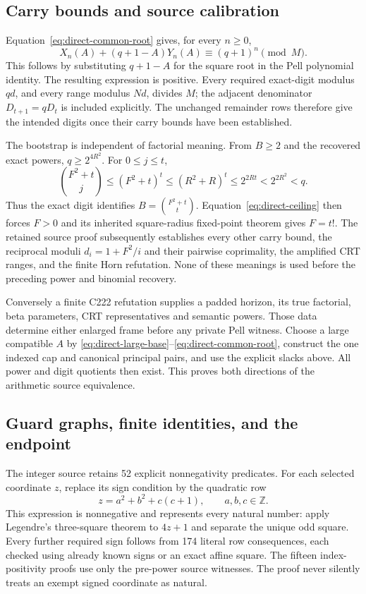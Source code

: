 \subsection{Carry bounds and source calibration}

Equation~\eqref{eq:direct-common-root} gives, for every $n\ge0$,
\[
 X_n(A)+(q+1-A)Y_n(A)\equiv(q+1)^n\pmod M.
\]
This follows by substituting $q+1-A$ for the square root in the Pell
polynomial identity. The resulting expression is positive. Every
required exact-digit modulus $qd$, and every range modulus $Nd$, divides
$M$; the adjacent denominator $D_{t+1}=qD_t$ is included explicitly.
The unchanged remainder rows therefore give the intended digits once
their carry bounds have been established.

The bootstrap is independent of factorial meaning. From $B\ge2$ and
the recovered exact powers, $q\ge2^{4R^2}$. For $0\le j\le t$,
\[
 \binom{F^2+t}{j}\le(F^2+t)^t
 \le(R^2+R)^t\le2^{2Rt}<2^{2R^2}<q.
\]
Thus the exact digit identifies $B=\binom{F^2+t}{t}$.
Equation~\eqref{eq:direct-ceiling} then forces $F>0$ and its inherited
square-radius fixed-point theorem gives $F=t!$.
The retained source proof subsequently establishes every other carry
bound, the reciprocal moduli
$d_i=1+F^2/i$ and their pairwise coprimality, the amplified CRT ranges,
and the finite Horn refutation.  None of these meanings is used before
the preceding power and binomial recovery.

Conversely a finite C222 refutation supplies a padded horizon, its true
factorial, beta parameters, CRT representatives and semantic powers.
Those data determine either enlarged frame before any private Pell
witness. Choose a large compatible $A$ by
\eqref{eq:direct-large-base}--\eqref{eq:direct-common-root}, construct
the one indexed cap and canonical principal pairs, and use the explicit
slacks above. All power and digit quotients then exist. This proves
both directions of the arithmetic source equivalence.

\subsection{Guard graphs, finite identities, and the endpoint}

The integer source retains 52 explicit nonnegativity predicates.
For each selected coordinate $z$, replace its sign condition by the
quadratic row
\[
 z=a^2+b^2+c(c+1),\qquad a,b,c\in\mathbb Z.
\]
This expression is nonnegative and represents every natural number:
apply Legendre's three-square theorem to $4z+1$ and separate the unique
odd square. Every further required sign follows from 174 literal row
consequences, each checked using already known signs or an exact affine
square. The fifteen index-positivity proofs use only the pre-power
source witnesses. The proof never silently treats an exempt signed
coordinate as natural.


